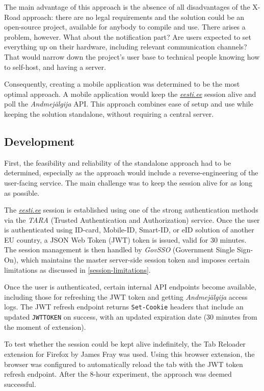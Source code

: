 The main advantage of this approach is the absence of all disadvantages of the X-Road approach: there are no legal requirements and the solution could be an open-source project, available for anybody to compile and use. There arises a problem, however. What about the notification part? Are users expected to set everything up on their hardware, including relevant communication channels? That would narrow down the project's user base to technical people knowing how to self-host, and having a server.

Consequently, creating a mobile application was determined to be the most optimal approach. A mobile application would keep the \textit{\href{https://www.eesti.ee}{eesti.ee}} session alive and poll the \textit{Andmejälgija} API. This approach combines ease of setup and use while keeping the solution standalone, without requiring a central server.

\subsection{Development}

First, the feasibility and reliability of the standalone approach had to be determined, especially as the approach would include a reverse-engineering of the user-facing service. The main challenge was to keep the session alive for as long as possible.

The \textit{\href{https://www.eesti.ee}{eesti.ee}} session is established using one of the strong authentication methods via the \textit{TARA} (Trusted Authentication and Authorization) service. Once the user is authenticated using ID-card, Mobile-ID, Smart-ID, or eID solution of another EU country, a JSON Web Token (JWT) token is issued, valid for 30 minutes. The session management is then handled by \textit{GovSSO} (Government Single Sign-On), which maintains the master server-side session token and imposes certain limitations as discussed in \ref{session-limitations}.

Once the user is authenticated, certain internal API endpoints become available, including those for refreshing the JWT token and getting \textit{Andmejälgija} access logs. The JWT refresh endpoint returns \texttt{Set-Cookie} headers that include an updated \texttt{JWTTOKEN} on success, with an updated expiration date (30 minutes from the moment of extension).

To test whether the session could be kept alive indefinitely, the Tab Reloader extension for Firefox by James Fray \cite{tab-reloader-addon} was used. Using this browser extension, the browser was configured to automatically reload the tab with the JWT token refresh endpoint. After the 8-hour experiment, the approach was deemed successful.

